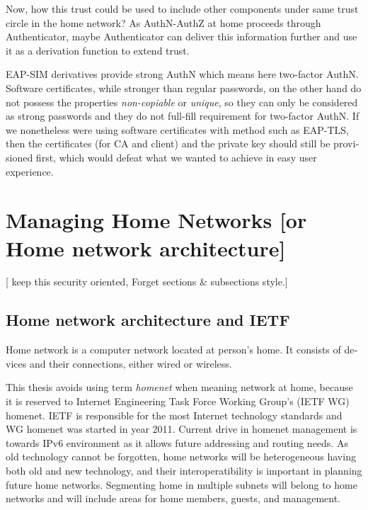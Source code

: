 \documentclass[12pt,a4paper,english]{tutthesis}
\begin{document}
\begin{otherlanguage}{english}
Now, how this trust could be used to include other components under
same trust circle in the home network?  As AuthN-AuthZ at home proceeds
through Authenticator, maybe Authenticator can deliver this
information further and use it as a derivation function to extend
trust.

EAP-SIM derivatives provide strong AuthN which means here two-factor
AuthN. Software certificates, while stronger than regular passwords,
on the other hand do not possess the properties \emph{non-copiable} or
\emph{unique}, so they can only be considered as strong passwords and they
do not full-fill requirement for two-factor AuthN.  If we nonetheless
were using software certificates with method such as EAP-TLS, then the
certificates (for CA and client) and the private key should still be
provisioned first, which would defeat what we wanted to achieve in
easy user experience.



\chapter{Managing Home Networks [or Home network architecture]}
\label{sec-3}
[ keep this security oriented, Forget sections \& subsections style.]

\section{Home network architecture and IETF}
\label{sec-3-1}


Home network is a computer network located at person's home. It consists
of devices and their connections, either wired or wireless.

This thesis avoids using term \emph{homenet} when meaning network at home,
because  it is  reserved to 
Internet Engineering Task Force Working Group's (IETF
WG) homenet. IETF is responsible for the most Internet technology standards and 
WG homenet was started in year 2011.
Current drive in homenet management is towards IPv6 environment
 as it allows future  addressing and routing needs. As old technology
cannot be forgotten, home networks will be heterogeneous having both
old and new technology, and their interoperatibility is important in
planning future home networks. Segmenting home in multiple subnets will belong
to home networks and will include areas for home members, guests,
and management.




\end{otherlanguage}
\end{document}
